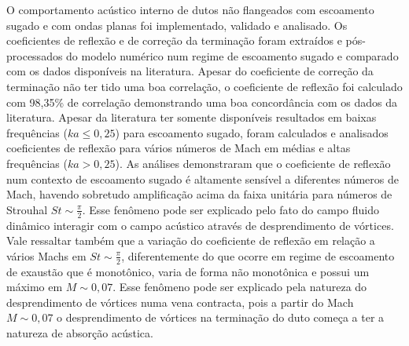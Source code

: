 O comportamento acústico interno de dutos não flangeados com escoamento sugado e com ondas planas foi implementado, validado e analisado. Os coeficientes de reflexão e de correção da terminação foram extraídos e pós-processados do modelo numérico num regime de escoamento sugado e comparado com os dados disponíveis na literatura. Apesar do coeficiente de correção da terminação não ter tido uma boa correlação, o coeficiente de reflexão foi calculado com 98,35\% de correlação demonstrando uma boa concordância com os dados da literatura. Apesar da literatura ter somente disponíveis resultados em baixas frequências ($ka \leq 0,25$) para escoamento sugado, foram calculados e analisados coeficientes de reflexão para vários números de Mach em médias e altas frequências ($ka > 0,25$). As análises demonstraram que o coeficiente de reflexão num contexto de escoamento sugado é altamente sensível a diferentes números de Mach, havendo sobretudo amplificação acima da faixa unitária para números de Strouhal $St \sim \frac{\pi}{2}$. Esse fenômeno pode ser explicado pelo fato do campo fluido dinâmico interagir com o campo acústico através de desprendimento de vórtices. Vale ressaltar também que a variação do coeficiente de reflexão em relação a vários Machs em $St \sim \frac{\pi}{2}$, diferentemente do que ocorre em regime de escoamento de exaustão que é monotônico, varia de forma não monotônica e possui um máximo em $M \sim 0,07$. Esse fenômeno pode ser explicado pela natureza do desprendimento de vórtices numa vena contracta, pois a partir do Mach $M \sim 0,07$ o desprendimento de vórtices na terminação do duto começa a ter a natureza de absorção acústica.  